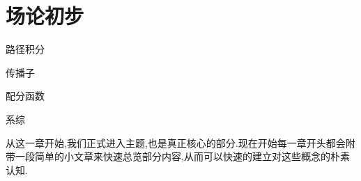 \ifx\allfiles\undefined



	\else
	\fi
\chapter{场论初步}
\begin{introduction}
	\item 路径积分
	\item 传播子
	\item 配分函数
	\item 系综
\end{introduction}
\begin{comment}
	注释:可爱且漂亮的公式形式.
	\begin{equation}
		\vspace{\baselineskip}
		
		定位点a \tikzmarknode{a}{\highlight{red颜色}{$公式内容$}}
		定位点s \tikzmarknode{s}{\highlight{blue}{$公式内容$}}
		
		定位点编码标准:1eq1 (公式序号eq该公式第几个)
	\end{equation}
	\begin{tikzpicture}[overlay,remember picture,>=stealth,nodes={align=left,inner ysep=1pt},<-]
	\path (1eq1.north) ++ (0,2em) node[anchor=south east,color=red!67] (eq1/1){\textbf{动能}};
	\draw [color=red!87](1eq1.north) |- ([xshift=-0.3ex,color=red]eq1/1.south west);
	\path (1eq2.south) ++ (0,-1.5em) node[anchor=north west,color=blue!67] (eq1/2){\textbf{势能}};
	\draw [color=blue!57](1eq2.south) |- ([xshift=-0.3ex,color=blue]eq1/2.south east);
	\end{tikzpicture}
\end{comment}
从这一章开始,我们正式进入主题,也是真正核心的部分.现在开始每一章开头都会附带一段简单的小文章来快速总览部分内容,从而可以快速的建立对这些概念的朴素认知.
